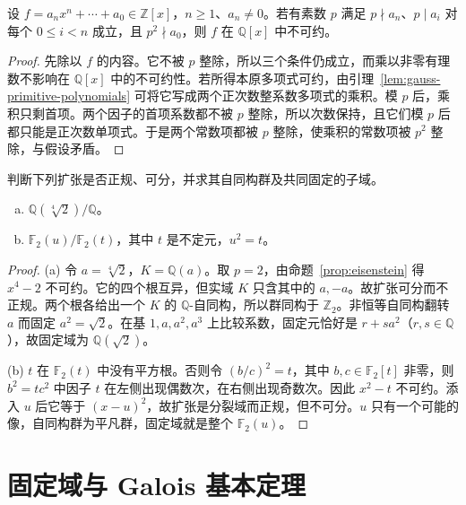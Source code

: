\documentclass[lang=cn,a4paper,fontset=none,zihao=false,10pt,openany,twoside]{beautybook}
\numberwithin{algorithm}{chapter}
\begin{document}
\begin{proposition}\label{prop:eisenstein}
设 $f=a_nx^n+\cdots+a_0\in\mathbb Z[x]$，$n\ge1$、$a_n\ne0$。若有素数 $p$ 满足 $p\nmid a_n$、$p\mid a_i$ 对每个 $0\le i<n$ 成立，且 $p^2\nmid a_0$，则 $f$ 在 $\mathbb Q[x]$ 中不可约。
\end{proposition}
\begin{proof}
先除以 $f$ 的内容。它不被 $p$ 整除，所以三个条件仍成立，而乘以非零有理数不影响在 $\mathbb Q[x]$ 中的不可约性。若所得本原多项式可约，由引理~\ref{lem:gauss-primitive-polynomials} 可将它写成两个正次数整系数多项式的乘积。模 $p$ 后，乘积只剩首项。两个因子的首项系数都不被 $p$ 整除，所以次数保持，且它们模 $p$ 后都只能是正次数单项式。于是两个常数项都被 $p$ 整除，使乘积的常数项被 $p^2$ 整除，与假设矛盾。
\end{proof}

\begin{example}[正规性与可分性各起什么作用]\label{ex:galois-two-conditions}
判断下列扩张是否正规、可分，并求其自同构群及共同固定的子域。
\begin{enumerate}[(a)]
\item $\mathbb Q(\sqrt[4]{2})/\mathbb Q$。
\item $\mathbb F_2(u)/\mathbb F_2(t)$，其中 $t$ 是不定元，$u^2=t$。
\end{enumerate}
\end{example}
\begin{proof}
\textup{(a)} 令 $a=\sqrt[4]{2}$，$K=\mathbb Q(a)$。取 $p=2$，由命题~\ref{prop:eisenstein} 得 $x^4-2$ 不可约。它的四个根互异，但实域 $K$ 只含其中的 $a,-a$。故扩张可分而不正规。两个根各给出一个 $K$ 的 $\mathbb Q$-自同构，所以群同构于 $\mathbb Z_2$。非恒等自同构翻转 $a$ 而固定 $a^2=\sqrt2$。在基 $1,a,a^2,a^3$ 上比较系数，固定元恰好是 $r+sa^2$（$r,s\in\mathbb Q$），故固定域为 $\mathbb Q(\sqrt2)$。

\textup{(b)} $t$ 在 $\mathbb F_2(t)$ 中没有平方根。否则令 $(b/c)^2=t$，其中 $b,c\in\mathbb F_2[t]$ 非零，则 $b^2=tc^2$ 中因子 $t$ 在左侧出现偶数次，在右侧出现奇数次。因此 $x^2-t$ 不可约。添入 $u$ 后它等于 $(x-u)^2$，故扩张是分裂域而正规，但不可分。$u$ 只有一个可能的像，自同构群为平凡群，固定域就是整个 $\mathbb F_2(u)$。
\end{proof}

\section{固定域与 Galois 基本定理}\label{sec:galois-correspondence}
\end{document}
